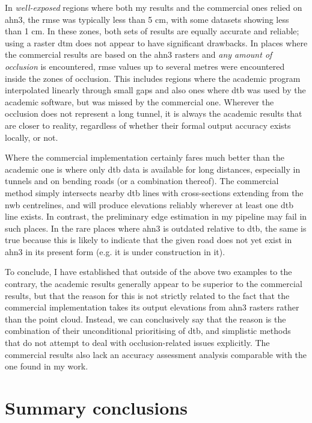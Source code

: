 In \textit{well-exposed} regions where both my results and the commercial ones relied on \ac{ahn3}, the \ac{rmse} was typically less than 5 cm, with some datasets showing less than 1 cm. In these zones, both sets of results are equally accurate and reliable; using a raster \ac{dtm} does not appear to have significant drawbacks. In places where the commercial results are based on the \ac{ahn3} rasters and \textit{any amount of occlusion} is encountered, \ac{rmse} values up to several metres were encountered inside the zones of occlusion. This includes regions where the academic program interpolated linearly through small gaps and also ones where \ac{dtb} was used by the academic software, but was missed by the commercial one. Wherever the occlusion does not represent a long tunnel, it is always the academic results that are closer to reality, regardless of whether their formal output accuracy exists locally, or not.

Where the commercial implementation certainly fares much better than the academic one is where only \ac{dtb} data is available for long distances, especially in tunnels and on bending roads (or a combination thereof). The commercial method simply intersects nearby \ac{dtb} lines with cross-sections extending from the \ac{nwb} centrelines, and will produce elevations reliably wherever at least one \ac{dtb} line exists. In contrast, the preliminary edge estimation in my pipeline may fail in such places. In the rare places where \ac{ahn3} is outdated relative to \ac{dtb}, the same is true because this is likely to indicate that the given road does not yet exist in \ac{ahn3} in its present form (e.g. it is under construction in it).

To conclude, I have established that outside of the above two examples to the contrary, the academic results generally appear to be superior to the commercial results, but that the reason for this is not strictly related to the fact that the commercial implementation takes its output elevations from \ac{ahn3} rasters rather than the point cloud. Instead, we can conclusively say that the reason is the combination of their unconditional prioritising of \ac{dtb}, and simplistic methods that do not attempt to deal with occlusion-related issues explicitly. The commercial results also lack an accuracy assessment analysis comparable with the one found in my work.

\section{Summary conclusions}
\label{sec:conclusions}

